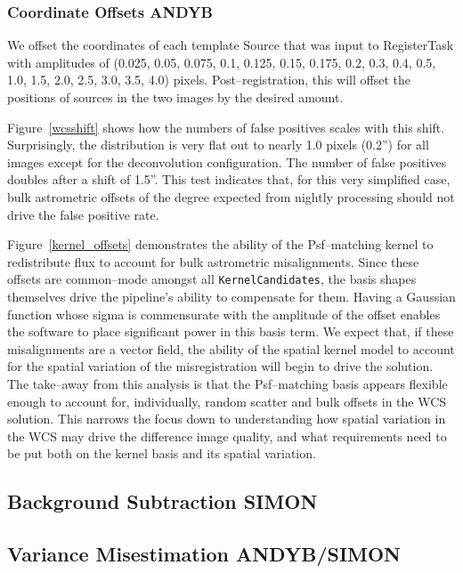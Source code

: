 \documentclass[prd, nofootinbib, floatfix, 11pt,tightenlines,times]{article}
\begin{document}
\subsubsection{Coordinate Offsets {\bf ANDYB}}

We offset the coordinates of each template Source that was input to
RegisterTask with amplitudes of (0.025, 0.05, 0.075, 0.1, 0.125, 0.15,
0.175, 0.2, 0.3, 0.4, 0.5, 1.0, 1.5, 2.0, 2.5, 3.0, 3.5, 4.0) pixels.
Post--registration, this will offset the positions of sources in the
two images by the desired amount.

Figure~\ref{wcsshift} shows how the numbers of false positives scales
with this shift.  Surprisingly, the distribution is very flat out to
nearly 1.0 pixels (0.2'') for all images except for the deconvolution
configuration.  The number of false positives doubles after a shift of
1.5''.  This test indicates that, for this very simplified case, bulk
astrometric offsets of the degree expected from nightly processing
should not drive the false positive rate.  

Figure~\ref{kernel_offsets} demonstrates the ability of the
Psf--matching kernel to redistribute flux to account for bulk
astrometric misalignments.  Since these offsets are common--mode
amongst all {\tt KernelCandidates}, the basis shapes themselves drive
the pipeline's ability to compensate for them.  Having a Gaussian
function whose sigma is commensurate with the amplitude of the offset
enables the software to place significant power in this basis term.  We
expect that, if these misalignments are a vector field, the ability of
the spatial kernel model to account for the spatial variation of the
misregistration will begin to drive the solution.  The take--away
from this analysis is that the Psf--matching basis appears flexible
enough to account for, individually, random scatter and bulk offsets
in the WCS solution.  This narrows the focus down to understanding how
spatial variation in the WCS may drive the difference image quality,
and what requirements need to be put both on the kernel basis and its
spatial variation.


\subsection{Background Subtraction {\bf SIMON} \label{sec-bg}}

\subsection{Variance Misestimation {\bf ANDYB/SIMON}}
\end{document}
